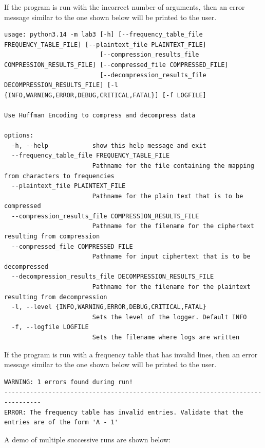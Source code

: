 \documentclass[10pt,letterpaper,final]{report}
\begin{document}
\noindent If the program is run with the incorrect number of arguments, then an error message similar to the one shown below will be printed to the user.

\begin{verbatim}
usage: python3.14 -m lab3 [-h] [--frequency_table_file FREQUENCY_TABLE_FILE] [--plaintext_file PLAINTEXT_FILE]
                          [--compression_results_file COMPRESSION_RESULTS_FILE] [--compressed_file COMPRESSED_FILE]
                          [--decompression_results_file DECOMPRESSION_RESULTS_FILE] [-l {INFO,WARNING,ERROR,DEBUG,CRITICAL,FATAL}] [-f LOGFILE]

Use Huffman Encoding to compress and decompress data

options:
  -h, --help            show this help message and exit
  --frequency_table_file FREQUENCY_TABLE_FILE
                        Pathname for the file containing the mapping from characters to frequencies
  --plaintext_file PLAINTEXT_FILE
                        Pathname for the plain text that is to be compressed
  --compression_results_file COMPRESSION_RESULTS_FILE
                        Pathname for the filename for the ciphertext resulting from compression
  --compressed_file COMPRESSED_FILE
                        Pathname for input ciphertext that is to be decompressed
  --decompression_results_file DECOMPRESSION_RESULTS_FILE
                        Pathname for the filename for the plaintext resulting from decompression
  -l, --level {INFO,WARNING,ERROR,DEBUG,CRITICAL,FATAL}
                        Sets the level of the logger. Default INFO
  -f, --logfile LOGFILE
                        Sets the filename where logs are written
\end{verbatim}


\noindent If the program is run with a frequency table that has invalid lines, then an error message similar to the one shown below will be printed to the user.

\begin{verbatim}
WARNING: 1 errors found during run!
--------------------------------------------------------------------------------
ERROR: The frequency table has invalid entries. Validate that the entries are of the form 'A - 1'

\end{verbatim}


\noindent A demo of multiple successive runs are shown below:
\end{document}
